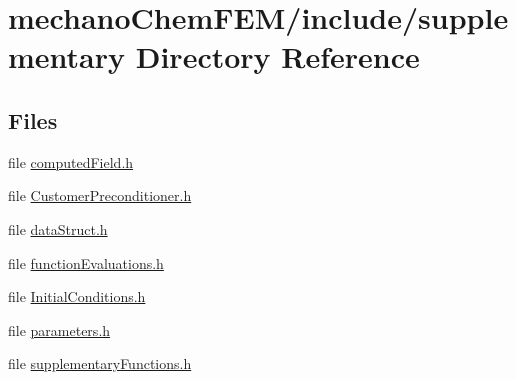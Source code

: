 \section{mechano\-Chem\-F\-E\-M/include/supplementary Directory Reference}
\label{dir_527ed3ffe4acd8953ceb1c919f167900}
\subsection*{Files}
\begin{DoxyCompactItemize}
\item 
file \hyperlink{computed_field_8h}{computed\-Field.\-h}
\item 
file \hyperlink{_customer_preconditioner_8h}{Customer\-Preconditioner.\-h}
\item 
file \hyperlink{data_struct_8h}{data\-Struct.\-h}
\item 
file \hyperlink{function_evaluations_8h}{function\-Evaluations.\-h}
\item 
file \hyperlink{_initial_conditions_8h}{Initial\-Conditions.\-h}
\item 
file \hyperlink{parameters_8h}{parameters.\-h}
\item 
file \hyperlink{supplementary_functions_8h}{supplementary\-Functions.\-h}
\end{DoxyCompactItemize}

